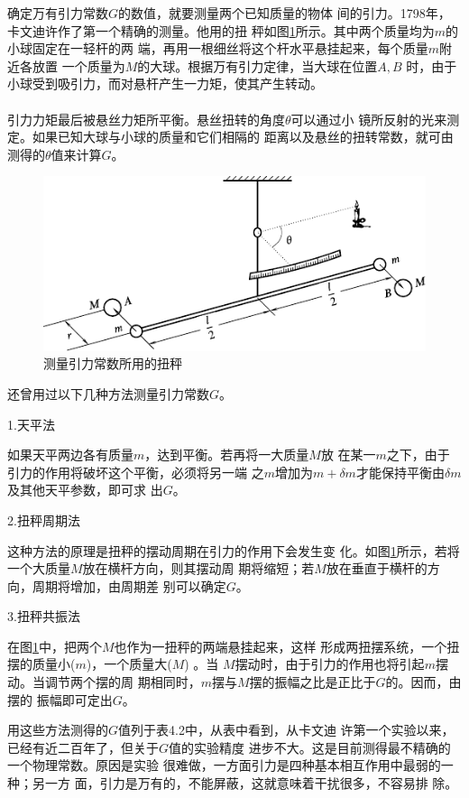 确定万有引力常数$ G $的数值，就要测量两个已知质量的物体
间的引力。1798年，卡文迪许作了第一个精确的测量。他用的扭
秤如图\ref{fig:04.04}所示。其中两个质量均为$ m $的小球固定在一轻杆的两
端，再用一根细丝将这个杆水平悬挂起来，每个质量$ m $附近各放置
一个质量为$ M $的大球。根据万有引力定律，当大球在位置$ A , B $
时，由于小球受到吸引力，而对悬杆产生一力矩，使其产生转动。\\~\\
引力力矩最后被悬丝力矩所平衡。悬丝扭转的角度$ \theta $可以通过小
镜所反射的光来测定。如果已知大球与小球的质量和它们相隔的
距离以及悬丝的扭转常数，就可由测得的$ \theta $值来计算$ G $。
\begin{figure}[h]
  \centering
  \includegraphics{figure/fig04.04}
  \caption{测量引力常数所用的扭秤}
  \label{fig:04.04}
\end{figure}

还曾用过以下几种方法测量引力常数$ G $。

\textsf{1.天平法}

如果天平两边各有质量$ m $，达到平衡。若再将一大质量$ M $放
在某一$ m $之下，由于引力的作用将破坏这个平衡，必须将另一端
之$ m $增加为$ m + \delta m $才能保持平衡由$ \delta m $及其他天平参数，即可求
出$ G $。

\textsf{2.扭秤周期法}

这种方法的原理是扭秤的摆动周期在引力的作用下会发生变
化。如图\ref{fig:04.04}所示，若将一个大质量$ M $放在横杆方向，则其摆动周
期将缩短；若$ M $放在垂直于横杆的方向，周期将增加，由周期差
别可以确定$ G $。

\textsf{3.扭秤共振法}

在图\ref{fig:04.04}中，把两个$ M $也作为一扭秤的两端悬挂起来，这样
形成两扭摆系统，一个扭摆的质量小($ m $)，一个质量大($ M $) 。当
$ M $摆动时，由于引力的作用也将引起$ m $摆动。当调节两个摆的周
期相同时，$ m $摆与$ M $摆的振幅之比是正比于$ G $的。因而，由摆的
振幅即可定出$ G $。

用这些方法测得的$ G $值列于表4.2中，从表中看到，从卡文迪
许第一个实验以来，已经有近二百年了，但关于$ G $值的实验精度
进步不大。这是目前测得最不精确的一个物理常数。原因是实验
很难做，一方面引力是四种基本相互作用中最弱的一种；另一方
面，引力是万有的，不能屏蔽，这就意味着干扰很多，不容易排
除。

